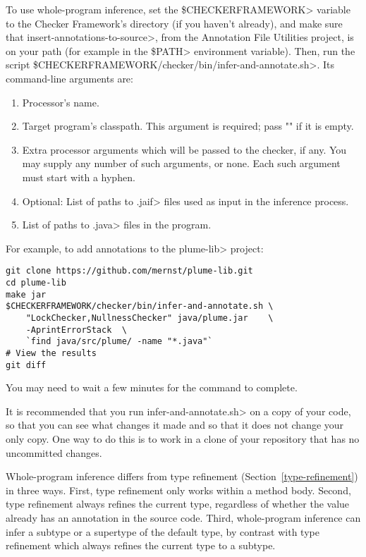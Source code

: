 To use whole-program inference,
set the \<\$CHECKERFRAMEWORK> variable to the Checker Framework's
directory (if you haven't already), and make sure that
\<insert-annotations-to-source>, from the Annotation File Utilities project,
is on your path (for example in the \<\$PATH> environment variable).
Then, run the script \<\$CHECKERFRAMEWORK/checker/bin/infer-and-annotate.sh>.
Its command-line arguments are:

\begin{enumerate}
\item Processor's name.
\item Target program's classpath.  This argument is required; pass "" if it
  is empty.
\item Extra processor arguments which will be passed to the checker, if any.
  You may supply any number of such arguments, or none.  Each such argument
  must start with a hyphen.
\item Optional: List of paths to \<.jaif> files used as input in the inference
    process.
\item List of paths to \<.java> files in the program.
\end{enumerate}

For example, to add annotations to the \<plume-lib> project:
\begin{Verbatim}
git clone https://github.com/mernst/plume-lib.git
cd plume-lib
make jar
$CHECKERFRAMEWORK/checker/bin/infer-and-annotate.sh \
    "LockChecker,NullnessChecker" java/plume.jar    \
    -AprintErrorStack  \
    `find java/src/plume/ -name "*.java"`
# View the results
git diff
\end{Verbatim}

You may need to wait a few minutes for the command to complete.

It is recommended that you run \<infer-and-annotate.sh> on a copy of your
code, so that you can see what changes it made and so that it does not
change your only copy.  One way to do this is to work in a clone of your
repository that has no uncommitted changes.

Whole-program inference differs from type refinement (Section~\ref{type-refinement})
in three ways.  First, type refinement only works within a method body.
Second, type refinement always
refines the current type, regardless of whether the value already has an
annotation in the source code.
Third, whole-program inference can infer a subtype
or a supertype of the default type, by contrast with type refinement which
always refines the current type to a subtype.


